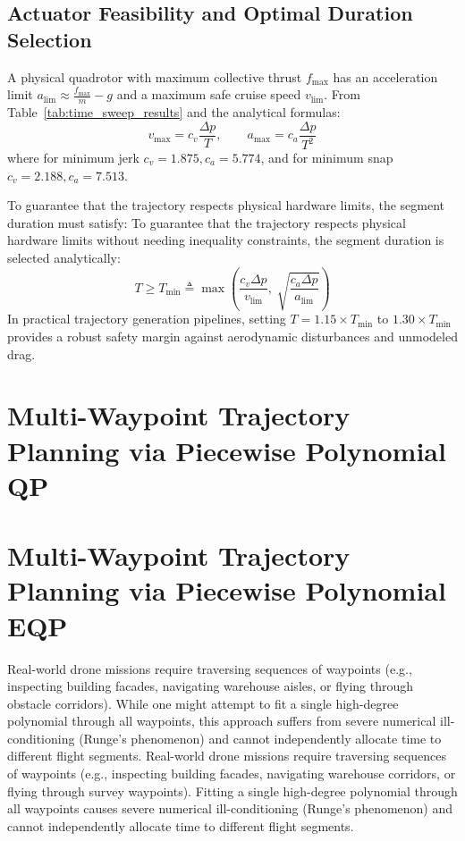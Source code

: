 \documentclass[11pt,a4paper]{article}
\begin{document}
\subsection{Actuator Feasibility and Optimal Duration Selection}

A physical quadrotor with maximum collective thrust $f_{\max}$ has an acceleration limit $a_{\lim} \approx \frac{f_{\max}}{m} - g$ and a maximum safe cruise speed $v_{\lim}$. From Table~\ref{tab:time_sweep_results} and the analytical formulas:
\begin{equation}
v_{\max} = c_v \frac{\Delta p}{T}, \qquad a_{\max} = c_a \frac{\Delta p}{T^2}
\end{equation}
where for minimum jerk $c_v = 1.875, c_a = 5.774$, and for minimum snap $c_v = 2.188, c_a = 7.513$.

To guarantee that the trajectory respects physical hardware limits, the segment duration must satisfy:
To guarantee that the trajectory respects physical hardware limits without needing inequality constraints, the segment duration is selected analytically:
\begin{equation}
T \ge T_{\min} \triangleq \max\left( \frac{c_v \Delta p}{v_{\lim}}, \; \sqrt{\frac{c_a \Delta p}{a_{\lim}}} \right)
\end{equation}
In practical trajectory generation pipelines, setting $T = 1.15 \times T_{\min}$ to $1.30 \times T_{\min}$ provides a robust safety margin against aerodynamic disturbances and unmodeled drag.

\section{Multi-Waypoint Trajectory Planning via Piecewise Polynomial QP}
\section{Multi-Waypoint Trajectory Planning via Piecewise Polynomial EQP}

Real-world drone missions require traversing sequences of waypoints (e.g., inspecting building facades, navigating warehouse aisles, or flying through obstacle corridors). While one might attempt to fit a single high-degree polynomial through all waypoints, this approach suffers from severe numerical ill-conditioning (Runge's phenomenon) and cannot independently allocate time to different flight segments.
Real-world drone missions require traversing sequences of waypoints (e.g., inspecting building facades, navigating warehouse corridors, or flying through survey waypoints). Fitting a single high-degree polynomial through all waypoints causes severe numerical ill-conditioning (Runge's phenomenon) and cannot independently allocate time to different flight segments.
\end{document}
